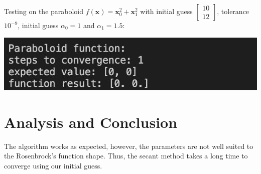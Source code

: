 \documentclass{article}
\begin{document}
\bigskip

Testing on the paraboloid $f(\textbf{x}) = \textbf{x}_0^2 + \textbf{x}_1^2$ with initial guess $\begin{bmatrix}
    10 \\
    12
\end{bmatrix}$, tolerance $10^{-9}$, initial guess $\alpha_0=1$ and $\alpha_1=1.5$:

\bigskip

\includegraphics[scale=0.5]{paraboloid.jpeg}

\bigskip


\section{Analysis and Conclusion}
The algorithm works as expected, however, the parameters are not well suited to the Rosenbrock's function shape. Thus, the secant method takes a long time to converge using our initial guess.
\end{document}
